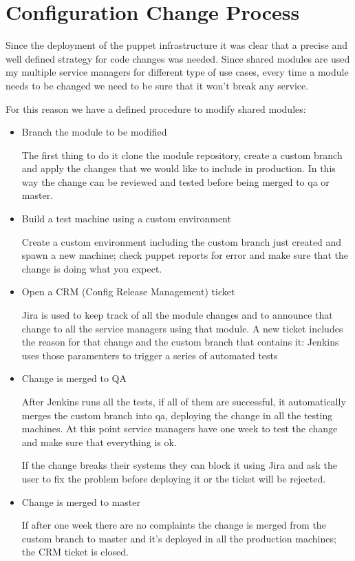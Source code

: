 \section{Configuration Change Process}

Since the deployment of the puppet infrastructure it was clear that a precise
and well defined strategy for code changes was needed. Since shared modules are
used my multiple service managers for different type of use cases, every time
a module needs to be changed we need to be sure that it won't break any
service.

For this reason we have a defined procedure to modify shared modules:

\begin{itemize}

\item Branch the module to be modified

The first thing to do it clone the module repository, create a custom branch
and apply the changes that we would like to include in production. In this way
the change can be reviewed and tested before being merged to qa or master.

\item Build a test machine using a custom environment

Create a custom environment including the custom branch just created and spawn
a new machine; check puppet reports for error and make sure that the change is
doing what you expect.

\item Open a CRM (Config Release Management) ticket

Jira is used to keep track of all the module changes and to announce that
change to all the service managers using that module. A new ticket includes the
reason for that change and the custom branch that contains it: Jenkins uses
those paramenters to trigger a series of automated tests

\item Change is merged to QA

After Jenkins runs all the tests, if all of them are successful, it
automatically merges the custom branch into qa, deploying the change in all the
testing machines. At this point service managers have one week to test the
change and make sure that everything is ok.

If the change breaks their systems they can block it using Jira and ask the
user to fix the problem before deploying it or the ticket will be rejected.

\item Change is merged to master

If after one week there are no complaints the change is merged from the custom
branch to master and it's deployed in all the production machines; the CRM
ticket is closed.

\end{itemize}

